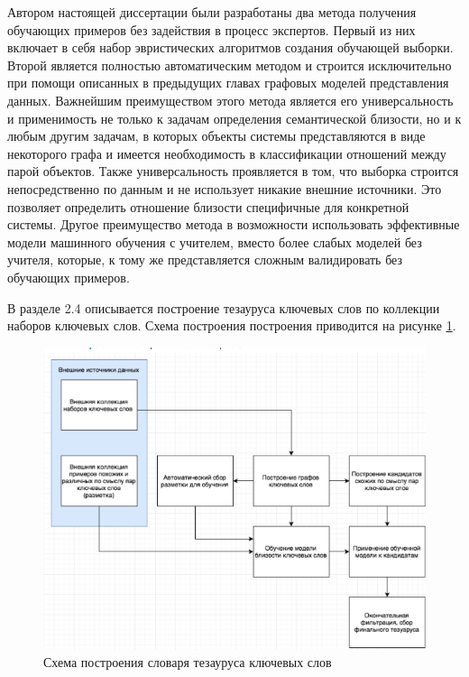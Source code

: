 Автором настоящей диссертации были разработаны два метода получения обучающих примеров без задействия в процесс экспертов. Первый из них включает в себя набор эвристических алгоритмов создания обучающей выборки. Второй является полностью автоматическим методом и строится исключительно при помощи описанных в предыдущих главах графовых моделей представления данных. Важнейшим преимуществом этого метода является его универсальность и применимость не только к задачам определения семантической близости, но и к любым другим задачам, в которых объекты системы представляются в виде некоторого графа и имеется необходимость в классификации отношений между парой объектов. Также универсальность проявляется в том, что выборка строится непосредственно по данным и не использует никакие внешние источники. Это позволяет определить отношение близости специфичные для конкретной системы. Другое преимущество метода в возможности использовать эффективные модели машинного обучения с учителем, вместо более слабых моделей без учителя, которые, к тому же представляется сложным валидировать без обучающих примеров.

В разделе 2.4 описывается построение тезауруса ключевых слов по коллекции наборов ключевых слов. Схема построения построения приводится на рисунке \ref{img:thes}.

\begin{figure}[ht]
  \begin{minipage}[ht]{1.0\linewidth}\centering
    \includegraphics[width=0.7\linewidth]{Dissertation/pics/thes}
    \caption{Схема построения словаря тезауруса ключевых слов}
  \end{minipage}
  \label{img:thes}
\end{figure}


